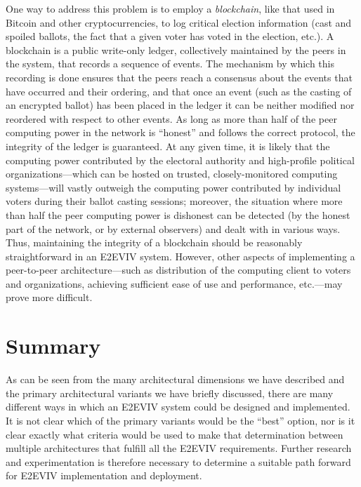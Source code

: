 One way to address this problem is to employ a \emph{blockchain}, like
that used in Bitcoin and other cryptocurrencies, to log critical
election information (cast and spoiled ballots, the fact that a given
voter has voted in the election, etc.). A blockchain is a public
write-only ledger, collectively maintained by the peers in the system,
that records a sequence of events. The mechanism by which this
recording is done ensures that the peers reach a consensus about the
events that have occurred and their ordering, and that once an event
(such as the casting of an encrypted ballot) has been placed in the
ledger it can be neither modified nor reordered with respect to other
events. As long as more than half of the peer computing power in the
network is ``honest'' and follows the correct protocol, the integrity
of the ledger is guaranteed. At any given time, it is likely that the
computing power contributed by the electoral authority and
high-profile political organizations---which can be hosted on trusted,
closely-monitored computing systems---will vastly outweigh the
computing power contributed by individual voters during their ballot
casting sessions; moreover, the situation where more than half the
peer computing power is dishonest can be detected (by the honest part
of the network, or by external observers) and dealt with in various
ways. Thus, maintaining the integrity of a blockchain should be
reasonably straightforward in an E2EVIV system. However, other aspects
of implementing a peer-to-peer architecture---such as distribution of
the computing client to voters and organizations, achieving sufficient
ease of use and performance, etc.---may prove more difficult.

\section{Summary}

As can be seen from the many architectural dimensions we have
described and the primary architectural variants we have briefly
discussed, there are many different ways in which an E2EVIV system
could be designed and implemented. It is not clear which of the
primary variants would be the ``best'' option, nor is it clear exactly
what criteria would be used to make that determination between
multiple architectures that fulfill all the E2EVIV
requirements. Further research and experimentation is therefore
necessary to determine a suitable path forward for E2EVIV
implementation and deployment.

